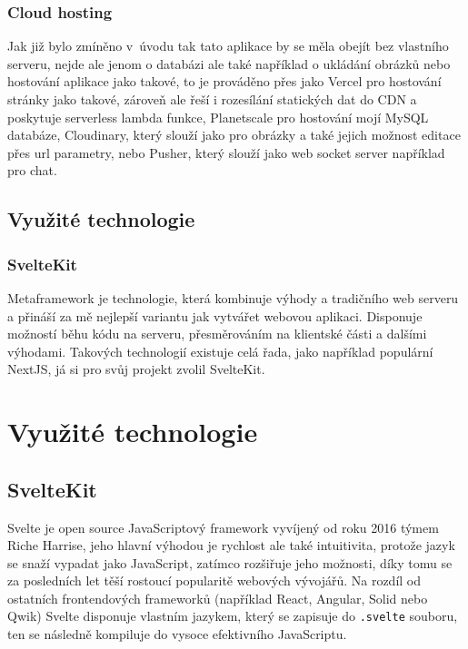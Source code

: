 \documentclass[12pt, a4paper,
openright
]{report}
\begin{document}
\subsection{Cloud hosting}
Jak již bylo zmíněno v~úvodu tak tato aplikace by se měla obejít bez vlastního serveru, nejde ale jenom o databázi ale také například o ukládání obrázků nebo hostování aplikace jako takové, to je prováděno přes  jako Vercel pro hostování stránky jako takové, zároveň ale řeší i rozesílání statických dat do CDN a poskytuje serverless lambda funkce, Planetscale pro hostování mojí MySQL databáze, Cloudinary, který slouží jako  pro obrázky a také jejich možnost editace přes url parametry, nebo Pusher, který slouží jako web socket server například pro chat.

\section{Využité technologie}

\subsection{SvelteKit}

Metaframework je technologie, která kombinuje výhody  a tradičního web serveru a přináší za mě nejlepší variantu jak vytvářet webovou aplikaci. Disponuje možností běhu kódu na serveru, přesměrováním na klientské části a dalšími výhodami. Takových technologií existuje celá řada, jako například populární NextJS, já si pro svůj projekt zvolil SvelteKit.

\chapter{Využité technologie}

\section{SvelteKit}

Svelte je open source JavaScriptový framework vyvíjený od roku 2016 týmem Riche Harrise, jeho hlavní výhodou je rychlost ale také intuitivita, protože jazyk se snaží vypadat jako JavaScript, zatímco rozšiřuje jeho možnosti, díky tomu se za posledních let těší rostoucí popularitě webových vývojářů. Na rozdíl od ostatních frontendových frameworků (například React, Angular, Solid nebo Qwik) Svelte disponuje vlastním jazykem, který se zapisuje do \texttt{.svelte} souboru, ten se následně kompiluje do vysoce efektivního JavaScriptu.\\
\end{document}
